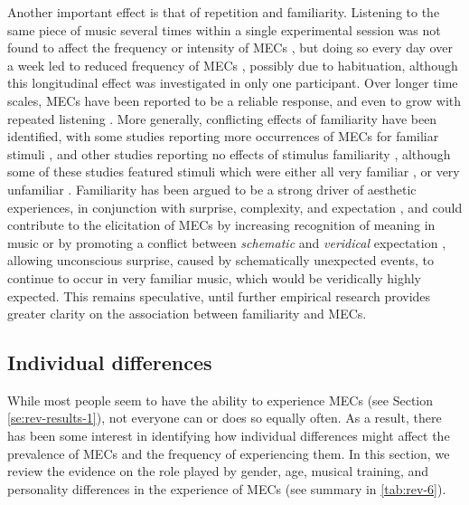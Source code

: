 Another important effect is that of repetition and familiarity. Listening to the same piece of music several times within a single experimental session was not found to affect the frequency or intensity of MECs \parencite{baltes2011, bannister2020b, blood2001}, but doing so every day over a week led to reduced frequency of MECs \parencite{grewe2007}, possibly due to habituation, although this longitudinal effect was investigated in only one participant. Over longer time scales, MECs have been reported to be a reliable response, and even to grow with repeated listening \parencite{sloboda1991}. More generally, conflicting effects of familiarity have been identified, with some studies reporting more occurrences of MECs for familiar stimuli \parencite{craig2005, grewe2009a, panksepp1995, rickard2004, weth2015}, and other studies reporting no effects of stimulus familiarity \parencite{bannister2018, bannister2019, benedek2011, colver2016, guhn2007, rickard2004, wassiliwizky2015}, although some of these studies featured stimuli which were either all very familiar \parencite{benedek2011}, or very unfamiliar \parencite{colver2016, guhn2007}. Familiarity has been argued to be a strong driver of aesthetic experiences, in conjunction with surprise, complexity, and expectation \parencite{greasley2016, salimpoor2015, verhaeghen2018}, and could contribute to the elicitation of MECs by increasing recognition of meaning in music or by promoting a conflict between \emph{schematic} and \emph{veridical} expectation \parencite{bharucha1994, huron2006, miranda2007, salimpoor2015}, allowing unconscious surprise, caused by schematically unexpected events, to continue to occur in very familiar music, which would be veridically highly expected. This remains speculative, until further empirical research provides greater clarity on the association between familiarity and MECs.

\subsection{Individual differences}
\label{se:rev-results-7}

While most people seem to have the ability to experience MECs (see Section \ref{se:rev-results-1}), not everyone can or does so equally often. As a result, there has been some interest in identifying how individual differences might affect the prevalence of MECs and the frequency of experiencing them. In this section, we review the evidence on the role played by gender, age, musical training, and personality differences in the experience of MECs (see summary in \autoref{tab:rev-6}).

